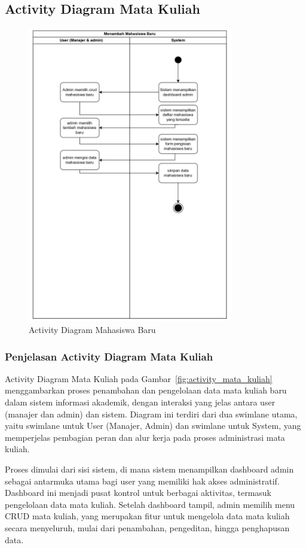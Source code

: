 \documentclass[a4paper,oneside,11pt]{book}
\begin{document}
\subsection{Activity Diagram Mata Kuliah}
\begin{figure}[H]
  \centering
  \includegraphics[width=0.8\textwidth]{Activity Diagram/Mahasiswa Baru.jpg}
  \caption{Activity Diagram Mahasiswa Baru}
  \label{fig:activity_mahasiswa_baru}
\end{figure}
\subsubsection{Penjelasan Activity Diagram Mata Kuliah}
Activity Diagram Mata Kuliah pada Gambar~\ref{fig:activity_mata_kuliah} menggambarkan proses penambahan dan pengelolaan data mata kuliah baru dalam sistem informasi akademik, dengan interaksi yang jelas antara user (manajer dan admin) dan sistem. Diagram ini terdiri dari dua swimlane utama, yaitu swimlane untuk User (Manajer, Admin) dan swimlane untuk System, yang memperjelas pembagian peran dan alur kerja pada proses administrasi mata kuliah.

Proses dimulai dari sisi sistem, di mana sistem menampilkan dashboard admin sebagai antarmuka utama bagi user yang memiliki hak akses administratif. Dashboard ini menjadi pusat kontrol untuk berbagai aktivitas, termasuk pengelolaan data mata kuliah. Setelah dashboard tampil, admin memilih menu CRUD mata kuliah, yang merupakan fitur untuk mengelola data mata kuliah secara menyeluruh, mulai dari penambahan, pengeditan, hingga penghapusan data.
\end{document}
